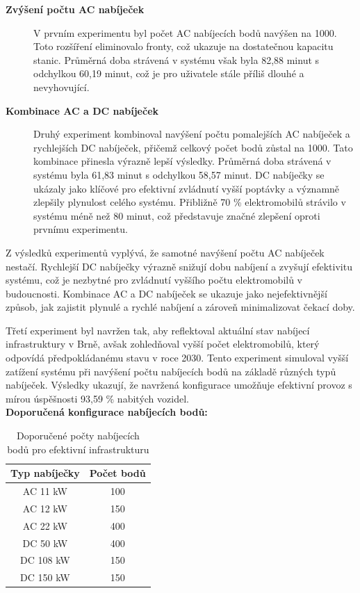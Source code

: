 \documentclass[a4paper,11pt]{article}
\begin{document}
\begin{description}
    \item[\textbf{Zvýšení počtu AC nabíječek}] V prvním experimentu byl počet AC nabíjecích bodů navýšen na 1000. Toto rozšíření eliminovalo fronty, což ukazuje na dostatečnou kapacitu stanic. Průměrná doba strávená v systému však byla 82,88 minut s odchylkou 60,19 minut, což je pro uživatele stále příliš dlouhé a nevyhovující.
    \item[\textbf{Kombinace AC a DC nabíječek}] Druhý experiment kombinoval navýšení počtu pomalejších AC nabíječek a rychlejších DC nabíječek, přičemž celkový počet bodů zůstal na 1000. Tato kombinace přinesla výrazně lepší výsledky. Průměrná doba strávená v systému byla 61,83 minut s odchylkou 58,57 minut. DC nabíječky se ukázaly jako klíčové pro efektivní zvládnutí vyšší poptávky a významně zlepšily plynulost celého systému. Přibližně 70 \% elektromobilů strávilo v systému méně než 80 minut, což představuje značné zlepšení oproti prvnímu experimentu.
\end{description}

Z výsledků experimentů vyplývá, že samotné navýšení počtu AC nabíječek nestačí. Rychlejší DC nabíječky výrazně snižují
dobu nabíjení a zvyšují efektivitu systému, což je nezbytné pro zvládnutí vyššího počtu elektromobilů v budoucnosti.
Kombinace AC a DC nabíječek se ukazuje jako nejefektivnější způsob, jak zajistit plynulé a rychlé nabíjení a zároveň
minimalizovat čekací doby.

Třetí experiment byl navržen tak, aby reflektoval aktuální stav nabíjecí infrastruktury v Brně, avšak zohledňoval
vyšší počet elektromobilů, který odpovídá předpokládanému stavu v roce 2030. Tento experiment simuloval vyšší zatížení
systému při navýšení počtu nabíjecích bodů na základě různých typů nabíječek. Výsledky ukazují, že navržená konfigurace
umožňuje efektivní provoz s mírou úspěšnosti 93,59 \% nabitých vozidel.\\

\textbf{Doporučená konfigurace nabíjecích bodů:}

\begin{table}[H]
    \centering
    \begin{tabular}{|c|c|}
        \hline
        \textbf{Typ nabíječky} & \textbf{Počet bodů} \\ \hline
        AC 11 kW & 100 \\ \hline
        AC 12 kW & 150 \\ \hline
        AC 22 kW & 400 \\ \hline
        DC 50 kW & 400 \\ \hline
        DC 108 kW & 150 \\ \hline
        DC 150 kW & 150 \\ \hline
    \end{tabular}
    \caption{Doporučené počty nabíjecích bodů pro efektivní infrastrukturu}
\end{table}
\end{document}
